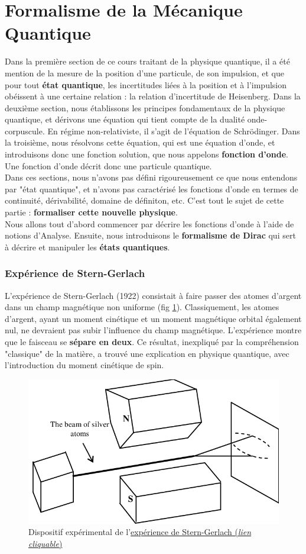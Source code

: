 \documentclass[../notesdecours.tex]{subfiles}
\begin{document}
\part{Formalisme de la Mécanique Quantique} \label{Formalisme de Dirac}
Dans la première section de ce cours traitant de la physique quantique, il a été mention de la mesure de la position d'une particule, de son impulsion, et que pour tout \textbf{état quantique}, les incertitudes liées à la position et à l'impulsion obéissent à une certaine relation : la relation d'incertitude de Heisenberg. Dans la deuxième section, nous établissons les principes fondamentaux de la physique quantique, et dérivons une équation qui tient compte de la dualité onde-corpuscule. En régime non-relativiste, il s'agit de l'équation de Schrödinger. Dans la troisième, nous résolvons cette équation, qui est une équation d'onde, et introduisons donc une fonction solution, que nous appelons \textbf{fonction d'onde}. Une fonction d'onde décrit donc une particule quantique. \\

Dans ces sections, nous n'avons pas défini rigoureusement ce que nous entendons par "état quantique", et n'avons pas caractérisé les fonctions d'onde en termes de continuité, dérivabilité, domaine de définiton, etc. C'est tout le sujet de cette partie : \textbf{formaliser cette nouvelle physique}. \\

Nous allons tout d'abord commencer par décrire les fonctions d'onde à l'aide de notions d'Analyse. Ensuite, nous introduisons le \textbf{formalisme de Dirac} qui sert à décrire et manipuler les \textbf{états quantiques}.
\section{Expérience de Stern-Gerlach}
L'expérience de Stern-Gerlach (1922) consistait à faire passer des atomes d'argent dans un champ magnétique non uniforme (fig \ref{fig:chap4-sterngerlach}). Classiquement, les atomes d'argent, ayant un moment cinétique et un moment magnétique orbital également nul, ne devraient pas subir l'influence du champ magnétique. L'expérience montre que le faisceau se \textbf{sépare en deux}. Ce résultat, inexpliqué par la compréhension "classique" de la matière, a trouvé une explication en physique quantique, avec l'introduction du moment cinétique de spin.\\

\begin{figure}[h]
\centering
\includegraphics[width=0.5\linewidth]{Stern-Gerlach}
\caption{Dispositif expérimental de l'\href{https://fr.wikipedia.org/wiki/Expérience_de_Stern_et_Gerlach}{expérience de Stern-Gerlach (\textit{lien cliquable})}}
\label{fig:chap4-sterngerlach}
\end{figure}
\end{document}
